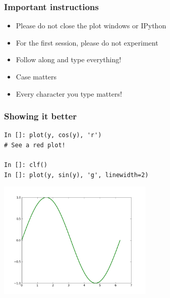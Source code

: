 \documentclass[14pt,compress]{beamer}
\newcommand{\emphbar}[1]
{\begin{beamercolorbox}[rounded=true]{emphbar}
      {#1}
 \end{beamercolorbox}
}
\newcounter{time}
\newcommand{\inctime}[1]{\addtocounter{time}{#1}{\tiny \thetime\ m}}
\begin{document}
\begin{frame}
  \frametitle{Important instructions}
  \begin{itemize}
  \item Please do not close the plot windows or IPython
  \item For the first session, please do not experiment
  \item Follow along and type everything!
  \item Case matters
  \item Every character you type matters!
  \end{itemize}
\end{frame}


\begin{frame}[fragile]
\frametitle{Showing it better}
\vspace{-0.15in}
\begin{lstlisting}
In []: plot(y, cos(y), 'r')
# See a red plot!

In []: clf()
In []: plot(y, sin(y), 'g', linewidth=2)
\end{lstlisting}
\vspace*{-0.2in}
\begin{center}
  \includegraphics[height=2.2in, interpolate=true]{data/green}
\end{center}
\end{frame}
\end{document}
